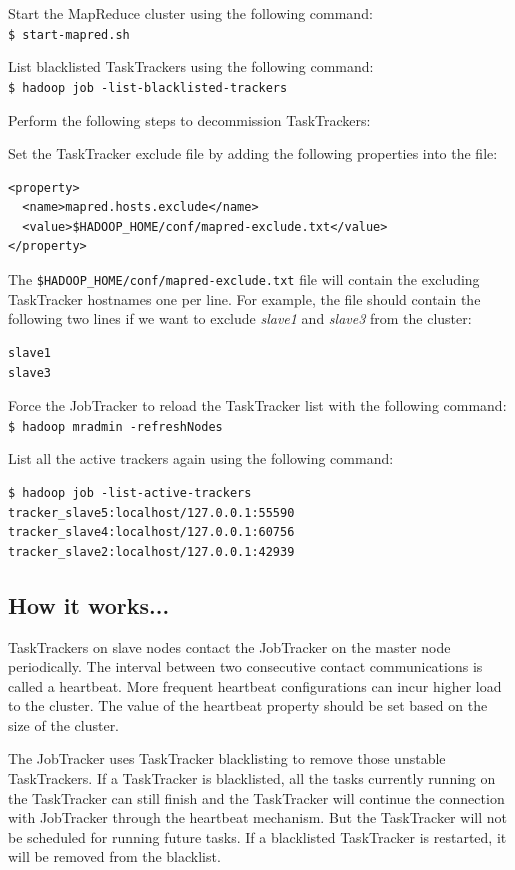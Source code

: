 Start the MapReduce cluster using the following command: \\
\verb|$ start-mapred.sh|

List blacklisted TaskTrackers using the following command: \\
\verb|$ hadoop job -list-blacklisted-trackers|

Perform the following steps to decommission TaskTrackers: 

Set the TaskTracker exclude file by adding the following properties into the file:
\begin{verbatim}
<property>
  <name>mapred.hosts.exclude</name>
  <value>$HADOOP_HOME/conf/mapred-exclude.txt</value>
</property>
\end{verbatim}

The \verb|$HADOOP_HOME/conf/mapred-exclude.txt| file will contain the excluding TaskTracker hostnames one per line. For example, the file should contain the following two lines if we want to exclude \emph{slave1} and \emph{slave3} from the cluster: 
\lstset{style=bashstyle}
\begin{lstlisting}
slave1
slave3
\end{lstlisting}

Force the JobTracker to reload the TaskTracker list with the following command: \\
\verb|$ hadoop mradmin -refreshNodes|

List all the active trackers again using the following command:
\lstset{style=bashstyle}
\begin{lstlisting}
$ hadoop job -list-active-trackers
tracker_slave5:localhost/127.0.0.1:55590
tracker_slave4:localhost/127.0.0.1:60756
tracker_slave2:localhost/127.0.0.1:42939
\end{lstlisting}

\subsection*{How it works...}
TaskTrackers on slave nodes contact the JobTracker on the master node periodically. The interval between two consecutive contact communications is called a heartbeat. More frequent heartbeat configurations can incur higher load to the cluster. The value of the heartbeat property should be set based on the size of the cluster.

The JobTracker uses TaskTracker blacklisting to remove those unstable TaskTrackers. If a TaskTracker is blacklisted, all the tasks currently running on the TaskTracker can still finish and the TaskTracker will continue the connection with JobTracker through the heartbeat mechanism. But the TaskTracker will not be scheduled for running future tasks. If a blacklisted TaskTracker is restarted, it will be removed from the blacklist.

